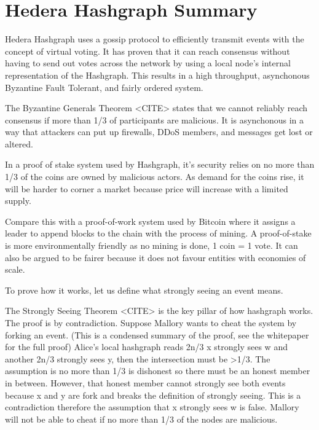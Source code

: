 \section{Hedera Hashgraph Summary}

Hedera Hashgraph uses a gossip protocol to efficiently transmit events with the concept of virtual voting. It has proven that it can reach consensus without having to send out votes across the network by using a local node's internal representation of the Hashgraph. This results in a high throughput, asynchonous Byzantine Fault Tolerant, and fairly ordered system.

The Byzantine Generals Theorem <CITE> states that we cannot reliably reach consensus if more than 1/3 of participants are malicious. It is asynchonous in a way that attackers can put up firewalls, DDoS members, and messages get lost or altered.

In a proof of stake system used by Hashgraph, it's security relies on no more than 1/3 of the coins are owned by malicious actors. As demand for the coins rise, it will be harder to corner a market because price will increase with a limited supply.

Compare this with a proof-of-work system used by Bitcoin where it assigns a leader to append blocks to the chain with the process of mining. A proof-of-stake is more environmentally friendly as no mining is done, 1 coin = 1 vote. It can also be argued to be fairer because it does not favour entities with economies of scale.

To prove how it works, let us define what strongly seeing an event means.

The Strongly Seeing Theorem <CITE> is the key pillar of how hashgraph works. The proof is by contradiction. Suppose Mallory wants to cheat the system by forking an event. (This is a condensed summary of the proof, see the whitepaper for the full proof) Alice's local hashgraph reads 2n/3 x strongly sees w and another 2n/3 strongly sees y, then the intersection must be >1/3. The assumption is no more than 1/3 is dishonest so there must be an honest member in between. However, that honest member cannot strongly see both events because x and y are fork and breaks the definition of strongly seeing. This is a contradiction therefore the assumption that x strongly sees w is false. Mallory will not be able to cheat if no more than 1/3 of the nodes are malicious.
